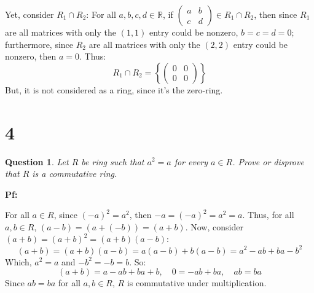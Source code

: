 \documentclass{article}
\newtheorem{question}{Question}
\begin{document}
\hfill

Yet, consider $R_1\cap R_2$: For all $a,b,c,d\in\mathbb{R}$, if $\begin{pmatrix}
    a&b\\c&d
\end{pmatrix} \in R_1\cap R_2$, then since $R_1$ are all matrices with only the $(1,1)$ entry could be nonzero, $b=c=d = 0$;
furthermore, since $R_2$ are all matrices with only the $(2,2)$ entry could be nonzero, then $a=0$. Thus:
$$R_1\cap R_2 = \left\{\begin{pmatrix}
    0&0\\0&0
\end{pmatrix}
\right\}$$
But, it is not considered as a ring, since it's the zero-ring.

\hfill

\hfill

\hfill

\section*{4}
\begin{question}
    Let $R$ be ring such that $a^2=a$ for every $a\in R$. Prove or disprove that $R$ is a
commutative ring.
\end{question}

\textbf{Pf:}

For all $a\in R$, since $(-a)^2=a^2$, then $-a=(-a)^2=a^2=a$. 
Thus, for all $a,b\in R$, $(a-b)=(a+(-b))=(a+b)$. Now, consider $(a+b)=(a+b)^2 = (a+b)(a-b)$:
$$(a+b)=(a+b)(a-b) = a(a-b)+b(a-b) = a^2-ab+ba-b^2$$
Which, $a^2=a$ and $-b^2 = -b = b$. So:
$$(a+b)=a-ab+ba+b,\quad 0 = -ab+ba,\quad ab=ba$$
Since $ab=ba$ for all $a,b\in R$, $R$ is commutative under multiplication.
\end{document}
